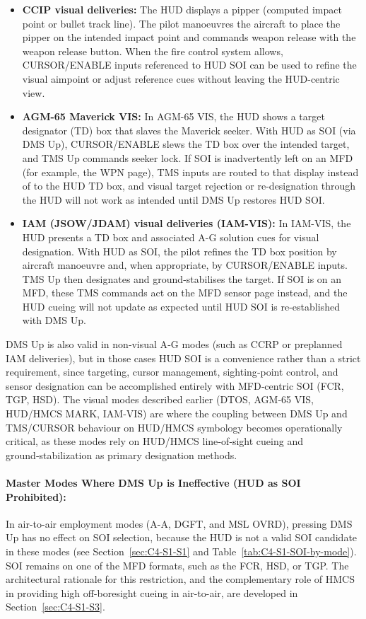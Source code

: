 \documentclass[11pt,a4paper]{article}
\begin{document}
\begin{itemize}
  \item \textbf{CCIP visual deliveries:} The HUD displays a pipper (computed impact point or bullet track line). The pilot manoeuvres the aircraft to place the pipper on the intended impact point and commands weapon release with the weapon release button. When the fire control system allows, CURSOR/ENABLE inputs referenced to HUD SOI can be used to refine the visual aimpoint or adjust reference cues without leaving the HUD-centric view.
  \item \textbf{AGM-65 Maverick VIS:} In AGM-65 VIS, the HUD shows a target designator (TD) box that slaves the Maverick seeker. With HUD as SOI (via DMS Up), CURSOR/ENABLE slews the TD box over the intended target, and TMS Up commands seeker lock. If SOI is inadvertently left on an MFD (for example, the WPN page), TMS inputs are routed to that display instead of to the HUD TD box, and visual target rejection or re-designation through the HUD will not work as intended until DMS Up restores HUD SOI.
  \item \textbf{IAM (JSOW/JDAM) visual deliveries (IAM-VIS):} In IAM-VIS, the HUD presents a TD box and associated A-G solution cues for visual designation. With HUD as SOI, the pilot refines the TD box position by aircraft manoeuvre and, when appropriate, by CURSOR/ENABLE inputs. TMS Up then designates and ground-stabilises the target. If SOI is on an MFD, these TMS commands act on the MFD sensor page instead, and the HUD cueing will not update as expected until HUD SOI is re-established with DMS Up.
\end{itemize}

DMS Up is also valid in non‑visual A‑G modes (such as CCRP or preplanned IAM deliveries), but in those cases HUD SOI is a convenience rather than a strict requirement, since targeting, cursor management, sighting‑point control, and sensor designation can be accomplished entirely with MFD‑centric SOI (FCR, TGP, HSD). The visual modes described earlier (DTOS, AGM‑65 VIS, HUD/HMCS MARK, IAM‑VIS) are where the coupling between DMS Up and TMS/CURSOR behaviour on HUD/HMCS symbology becomes operationally critical, as these modes rely on HUD/HMCS line‑of‑sight cueing and ground‑stabilization as primary designation methods.

\paragraph*{Master Modes Where DMS Up is Ineffective (HUD as SOI Prohibited):}
In air-to-air employment modes (A-A, DGFT, and MSL OVRD), pressing DMS Up has no effect on SOI selection, because the HUD is not a valid SOI candidate in these modes (see Section~\ref{sec:C4-S1-S1} and Table~\ref{tab:C4-S1-SOI-by-mode}). SOI remains on one of the MFD formats, such as the FCR, HSD, or TGP. The architectural rationale for this restriction, and the complementary role of HMCS in providing high off-boresight cueing in air-to-air, are developed in Section~\ref{sec:C4-S1-S3}.
\end{document}
